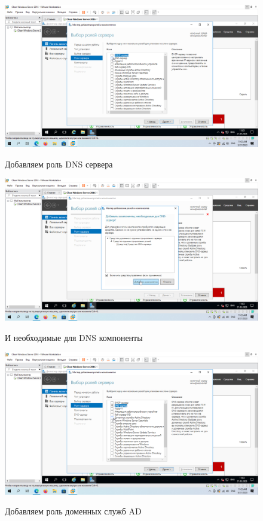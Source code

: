 \documentclass[a4paper]{article}
\begin{document}
  \begin{figure}[H]
    \centering
    \includegraphics[width=\textwidth]{11_0006}
    \label{img:6}
    \caption{Добавляем роль DNS сервера}
  \end{figure}

  \begin{figure}[H]
    \centering
    \includegraphics[width=\textwidth]{11_0007}
    \label{img:7}
    \caption{И необходимые для DNS компоненты}
  \end{figure}

  \begin{figure}[H]
    \centering
    \includegraphics[width=\textwidth]{11_0008}
    \label{img:8}
    \caption{Добавляем роль доменных служб AD}
  \end{figure}
\end{document}
